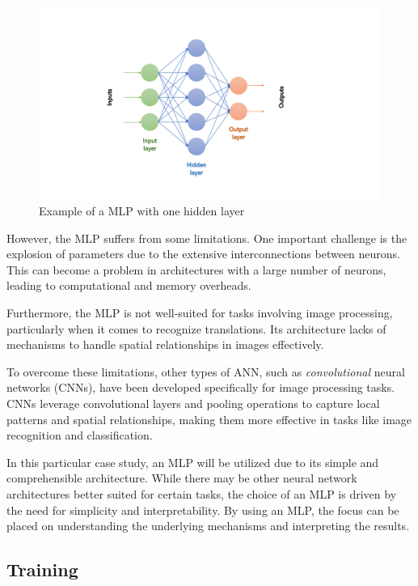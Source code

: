 \begin{figure}[h]
	\centering
	\includegraphics[width=1\linewidth]{ImageFiles/NeuralNetworks/mlp}
	\caption{Example of a MLP with one hidden layer}
	\label{fig:mlp}
\end{figure}

However, the MLP suffers from some limitations. One important challenge is the explosion of parameters due to the extensive interconnections between neurons. This can become a problem in architectures with a large number of neurons, leading to computational and memory overheads.

Furthermore, the MLP is not well-suited for tasks involving image processing, particularly when it comes to recognize translations. Its architecture lacks of mechanisms to handle spatial relationships in images effectively.

To overcome these limitations, other types of ANN, such as \textit{convolutional} neural networks (CNNs), have been developed specifically for image processing tasks. CNNs leverage convolutional layers and pooling operations to capture local patterns and spatial relationships, making them more effective in tasks like image recognition and classification.

In this particular case study, an MLP will be utilized due to its simple and comprehensible architecture. While there may be other neural network architectures better suited for certain tasks, the choice of an MLP is driven by the need for simplicity and interpretability. By using an MLP, the focus can be placed on understanding the underlying mechanisms and interpreting the results.

\subsection{Training}

